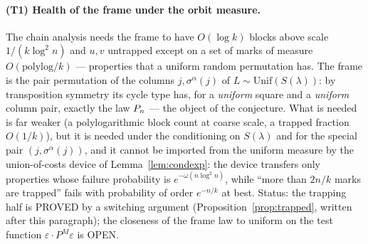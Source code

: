 \paragraph{(T1) Health of the frame under the orbit measure.}
The chain analysis needs the frame to have $O(\log k)$ blocks above
scale $1/(k\log^2n)$ and $u,v$ untrapped except on a set of marks of
measure $O(\mathrm{polylog}/k)$ --- properties that a uniform random
permutation has.  The frame is the pair permutation of the columns
$j,\sigma^\alpha(j)$ of $L\sim\mathrm{Unif}(S(\lambda))$: by
transposition symmetry its cycle type has, for a \emph{uniform}
square and a \emph{uniform} column pair, exactly the law $P_n$
--- the object of the conjecture.  What is needed is far weaker (a
polylogarithmic block count at coarse scale, a trapped fraction
$O(1/k)$), but it is needed under the conditioning on $S(\lambda)$
and for the special pair $(j,\sigma^\alpha(j))$, and it cannot be
imported from the uniform measure by the union-of-costs device of
Lemma~\ref{lem:condexp}: the device transfers only properties whose
failure probability is $e^{-\omega(n\log^2n)}$, while ``more than
$2n/k$ marks are trapped'' fails with probability of order
$e^{-n/k}$ at best.  Status: the trapping half is PROVED by a
switching argument (Proposition~\ref{prop:trapped}, written after
this paragraph); the closeness of the frame law to uniform on the test
function $\varepsilon\cdot P^M\varepsilon$ is OPEN.

